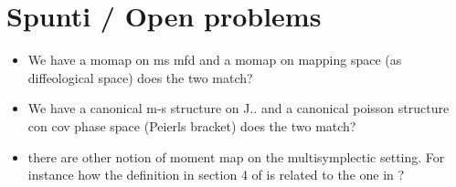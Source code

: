 \section{Spunti / Open problems}
\begin{itemize}
	\item We have a momap on ms mfd and a momap on mapping space (as diffeological space) does the two match?
	\item We have a canonical m-s structure on J.. and a canonical poisson structure con cov phase space (Peierls bracket) does the two match?
	\item there are other notion of moment map on the multisymplectic setting. For instance how the definition in section 4 of \cite{Gotay1998a} is related to the one in \cite{Ryvkin2018}?
\end{itemize}
	


\nocite{*}






